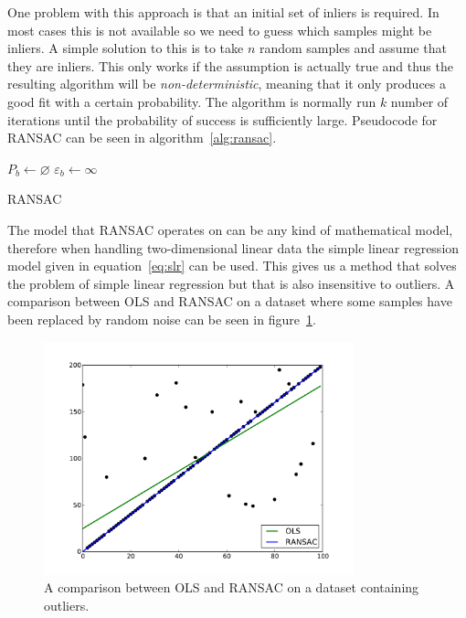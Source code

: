 \documentclass[a4paper]{report}
\begin{document}
One problem with this approach is that an initial set of inliers is required.
In most cases this is not available so we need to guess which samples might be
inliers. A simple solution to this is to take $n$ random samples and assume
that they are inliers. This only works if the assumption is actually true and
thus the resulting algorithm will be \emph{non-deterministic}, meaning that it
only produces a good fit with a certain probability. The algorithm is normally
run $k$ number of iterations until the probability of success is sufficiently
large. Pseudocode for RANSAC can be seen in algorithm~\ref{alg:ransac}.

{
    \fontsize{10}{12}
    \selectfont
    \begin{algorithm}[t]
        \DontPrintSemicolon
        \BlankLine
        \BlankLine
        $P_b \gets \varnothing$\;
        $\varepsilon_b \gets \infty$\;
        \BlankLine
        \caption{RANSAC}
        \label{alg:ransac}
    \end{algorithm}
}

The model that RANSAC operates on can be any kind of mathematical model,
therefore when handling two-dimensional linear data the simple linear
regression model given in equation~\ref{eq:slr} can be used. This gives us a
method that solves the problem of simple linear regression but that is also
insensitive to outliers. A comparison between OLS and RANSAC on a dataset where
some samples have been replaced by random noise can be seen in
figure~\ref{fig:ransac}.

\begin{figure}[h]
    \centering
    \includegraphics[width=0.8\textwidth]{img/ransac}
    \captionsetup{width=0.8\textwidth}
    \caption{A comparison between OLS and RANSAC on a dataset containing
    outliers.}
    \label{fig:ransac}
\end{figure}
\end{document}
